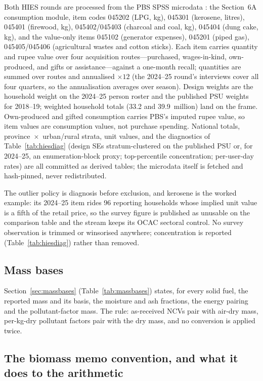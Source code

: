 Both HIES rounds are processed from the PBS SPSS microdata \citep{hies2019,hies2025}:
the Section~6A consumption module, item codes 045202 (LPG, kg), 045301 (kerosene,
litres), 045401 (firewood, kg), 045402/045403 (charcoal and coal, kg), 045404 (dung
cake, kg), and the value-only items 045102 (generator expenses), 045201 (piped gas),
045405/045406 (agricultural wastes and cotton sticks). Each item carries quantity and
rupee value over four acquisition routes---purchased, wages-in-kind, own-produced, and
gifts or assistance---against a one-month recall; quantities are summed over routes and
annualised $\times 12$ (the 2024--25 round's interviews cover all four quarters, so the
annualisation averages over season). Design weights are the household weight on the
2024--25 person roster and the published PSU weights for 2018--19; weighted household
totals (33.2 and 39.9~million) land on the frame. Own-produced and gifted consumption
carries PBS's imputed rupee value, so item values are consumption values, not purchase
spending. National totals, province~$\times$~urban/rural strata, unit values, and the
diagnostics of Table~\ref{tab:hiesdiag} (design SEs stratum-clustered on the published
PSU or, for 2024--25, an enumeration-block proxy; top-percentile concentration;
per-user-day rates) are all committed as derived tables; the microdata itself is
fetched and hash-pinned, never redistributed.

The outlier policy is diagnosis before exclusion, and kerosene is the worked example:
its 2024--25 item rides 96 reporting households whose implied unit value is a fifth of
the retail price, so the survey figure is published as unusable on the comparison table
and the stream keeps its OCAC sectoral control. No survey observation is trimmed or
winsorised anywhere; concentration is reported (Table~\ref{tab:hiesdiag}) rather than
removed.

\subsection{Mass bases}

Section~\ref{sec:massbases} (Table~\ref{tab:massbases}) states, for every solid fuel,
the reported mass and its basis, the moisture and ash fractions, the energy pairing and
the pollutant-factor mass. The rule: as-received NCVs pair with air-dry mass, per-kg-dry
pollutant factors pair with the dry mass, and no conversion is applied twice.

\subsection{The biomass memo convention, and what it does to the arithmetic}

